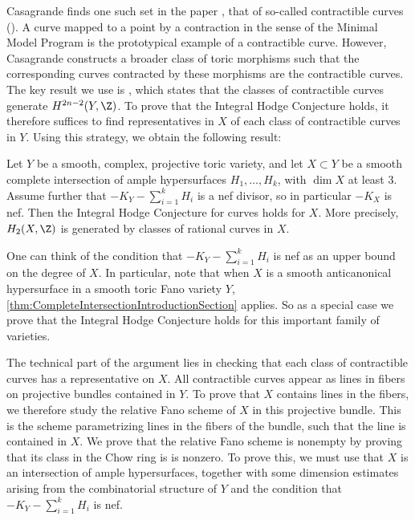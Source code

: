 Casagrande finds one such set in the paper \cite{Casagrande}, that of so-called contractible curves (\cite[Definition 2.3]{Casagrande}). A curve mapped to a point by a contraction in the sense of the Minimal Model Program is the prototypical example of a contractible curve. However, Casagrande constructs a broader class of toric morphisms such that the corresponding curves contracted by these morphisms are the contractible curves. The key result we use is \cite[Theorem 4.1]{Casagrande}, which states that the classes of contractible curves generate $H^{2n-2}(Y,\Z)$. To prove that the Integral Hodge Conjecture holds, it therefore suffices to find representatives in $X$ of each class of contractible curves in $Y$. Using this strategy, we obtain the following result:
\begin{theorem}
	\label{thm:CompleteIntersectionIntroductionSection}
	Let $Y$ be a smooth, complex, projective toric variety, and let $X \subset Y$ be a smooth complete intersection of ample hypersurfaces $H_1,\dots,H_k$, with $\dim X$ at least $3$. Assume further that $-K_Y - \sum_{i=1}^kH_i$ is a nef divisor, so in particular $-K_X$ is nef. Then the Integral Hodge Conjecture for curves holds for $X$. More precisely, $H_2(X,\Z)$ is generated by classes of rational curves in $X$.
\end{theorem}
One can think of the condition that $-K_Y - \sum_{i=1}^kH_i$ is nef as an upper bound on the degree of $X$. In particular, note that when $X$ is a smooth anticanonical hypersurface in a smooth toric Fano variety $Y$, \cref{thm:CompleteIntersectionIntroductionSection} applies. So as a special case we prove that the Integral Hodge Conjecture holds for this important family of \CY varieties.

The technical part of the argument lies in checking that each class of contractible curves has a representative on $X$. All contractible curves appear as lines in fibers on projective bundles contained in $Y$. To prove that $X$ contains lines in the fibers, we therefore study the relative Fano scheme of $X$ in this projective bundle. This is the scheme parametrizing lines in the fibers of the bundle, such that the line is contained in $X$. We prove that the relative Fano scheme is nonempty by proving that its class in the Chow ring is is nonzero. To prove this, we must use that $X$ is an intersection of ample hypersurfaces, together with some dimension estimates arising from the combinatorial structure of $Y$ and the condition that $-K_Y - \sum_{i=1}^kH_i$ is nef.

